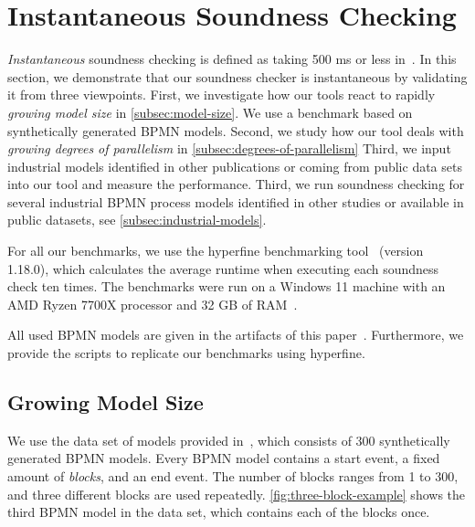 \documentclass[runningheads]{llncs}
\begin{document}
\section{Instantaneous Soundness Checking} \label{sec:instantaneous}
\textit{Instantaneous} soundness checking is defined as taking 500 ms or less in~\cite{fahlandAnalysisDemandInstantaneous2011}.
In this section, we demonstrate that our soundness checker is instantaneous by validating it from three viewpoints.
First, we investigate how our tools react to rapidly \textit{growing model size} in \autoref{subsec:model-size}.
We use a benchmark based on synthetically generated BPMN models.
Second, we study how our tool deals with \textit{growing degrees of parallelism} in \autoref{subsec:degrees-of-parallelism}
Third, we input industrial models identified in other publications or coming from public data sets into our tool and measure the performance.
Third, we run soundness checking for several industrial BPMN process models identified in other studies or available in public datasets, see \autoref{subsec:industrial-models}. %

For all our benchmarks, we use the hyperfine benchmarking tool~\cite{peterHyperfine2023} (version 1.18.0), which calculates the average runtime when executing each soundness check ten times.
The benchmarks were run on a Windows 11 machine with an AMD Ryzen 7700X processor and 32 GB of RAM~\cite{noauthorgivenBPM2024Artifacts2024}.

All used BPMN models are given in the artifacts of this paper~\cite{noauthorgivenBPM2024Artifacts2024}.
Furthermore, we provide the scripts to replicate our benchmarks using hyperfine.


\subsection{Growing Model Size} \label{subsec:model-size}
We use the data set of models provided in~\cite{krauterHigherorderTransformationApproach2023}, which consists of 300 synthetically generated BPMN models.
Every BPMN model contains a start event, a fixed amount of \textit{blocks}, and an end event.
The number of blocks ranges from 1 to 300, and three different blocks are used repeatedly.
\autoref{fig:three-block-example} shows the third BPMN model in the data set, which contains each of the blocks once.
\end{document}
